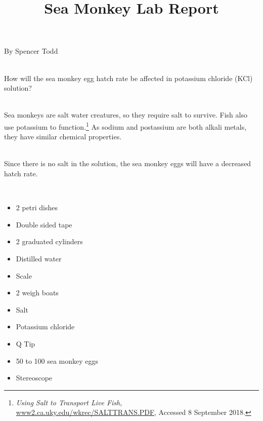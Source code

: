 \documentclass[12pt]{article}
\begin{document}
\title{Sea Monkey Lab Report}{By Spencer Todd}\double

\\
How will the sea monkey egg hatch rate be affected in potassium chloride (KCl) solution?\double

\\
Sea monkeys are salt water creatures, so they require salt to survive. Fish also use potassium to function.\footnote{\textit{Using
Salt to Transport Live Fish}, \url{www2.ca.uky.edu/wkrec/SALTTRANS.PDF}, Accessed 8 September 2018.} As sodium and postassium are
both alkali metals, they have similar chemical properties.\double

\\
Since there is no salt in the solution, the sea monkey eggs will have a decreased hatch rate.\double

\\
\begin{itemize}
    \item 2 petri dishes
    \item Double sided tape
    \item 2 graduated cylinders
    \item Distilled water
    \item Scale
    \item 2 weigh boats
    \item Salt
    \item Potassium chloride
    \item Q Tip
    \item 50 to 100 sea monkey eggs
    \item Stereoscope
\end{itemize}
\end{document}

